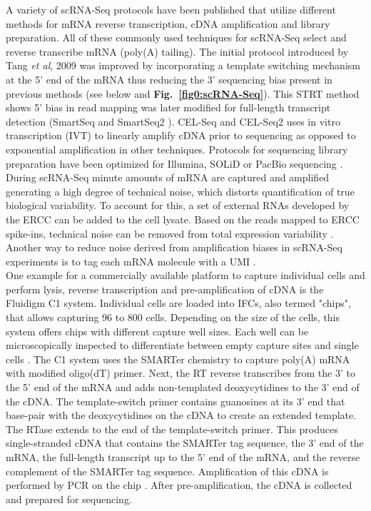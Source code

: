 A variety of scRNA-Seq protocols have been published that utilize different methods for mRNA reverse transcription, cDNA amplification and library preparation. All of these commonly used techniques for scRNA-Seq select and reverse transcribe mRNA (poly(A) tailing). The initial protocol introduced by Tang \textit{et al}, 2009 \citep{Tang2009} was improved by incorporating a template switching mechanism at the 5' end of the mRNA thus reducing the 3' sequencing bias present in previous methods \citep{Islam2011} (see below and \textbf{Fig.~\ref{fig0:scRNA-Seq}}). This \gls{STRT} method shows 5' bias in read mapping was later modified for full-length transcript detection (SmartSeq \citep{Ramskold2012} and SmartSeq2 \citep{Picelli2013}). CEL-Seq \citep{Hashimshony2012} and CEL-Seq2 \citep{Hashimshony2016} uses in vitro transcription (IVT) to linearly amplify cDNA prior to sequencing as opposed to exponential amplification in other techniques. Protocols for sequencing library preparation have been optimized for Illumina, SOLiD or PacBio sequencing \citep{Kolodziejczyk2015review}. \\

During scRNA-Seq minute amounts of mRNA are captured and amplified generating a high degree of technical noise, which distorts quantification of true biological variability. To account for this, a set of external RNAs developed by the \gls{ERCC} \citep{Rna2005} can be added to the cell lysate. Based on the reads mapped to ERCC spike-ins, technical noise can be removed from total expression variability \citep{Brennecke2013, Vallejos2015BASiCS}. Another way to reduce noise derived from amplification biases in scRNA-Seq experiments is to tag each mRNA molecule with a \gls{UMI} \citep{Kivioja2011, Islam2014}.\\

One example for a commercially available platform to capture individual cells and perform lysis, reverse transcription and pre-amplification of cDNA is the Fluidigm\textsuperscript{\textregistered{}} C1 system. Individual cells are loaded into \glspl{IFC}, also termed "chips", that allows capturing 96 to 800 cells. Depending on the size of the cells, this system offers chips with different capture well sizes. Each well can be microscopically inspected to differentiate between empty capture sites and single cells \citep{Kolodziejczyk2015review}. The C1 system uses the SMARTer\textsuperscript{\textregistered{}} chemistry to capture poly(A) mRNA with modified oligo(dT) primer. Next, the \gls{RT} reverse transcribes from the 3' to the 5' end of the mRNA and adds non-templated deoxycytidines to the 3' end of the cDNA. The template-switch primer contains guanosines at its 3' end that base-pair with the deoxycytidines on the cDNA to create an extended template. The RTase extends to the end of the template-switch primer. This produces single-stranded cDNA that contains the SMARTer tag sequence, the 3' end of the mRNA, the full-length transcript up to the 5' end of the mRNA, and the reverse complement of the SMARTer tag sequence. Amplification of this cDNA is performed by PCR on the chip \cite{Fluidigm2015}. After pre-amplification, the cDNA is collected and prepared for sequencing.\\

